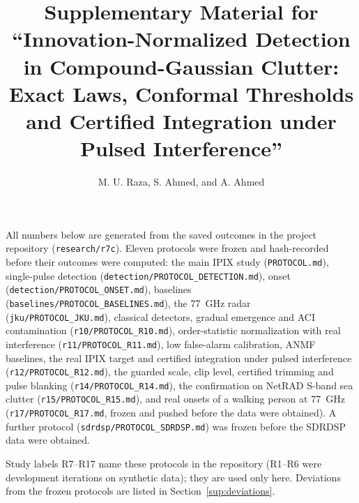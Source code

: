 \documentclass[10pt]{article}
\title{Supplementary Material for ``Innovation-Normalized Detection in Compound-Gaussian Clutter: Exact Laws, Conformal Thresholds and Certified Integration under Pulsed Interference''}
\author{M. U. Raza, S. Ahmed, and A. Ahmed}
\date{}
\begin{document}
\sloppy
\maketitle
\noindent All numbers below are generated from the saved outcomes in the project repository (\texttt{research/r7c}). Eleven protocols were frozen and hash-recorded before their outcomes were computed: the main IPIX study (\texttt{PROTOCOL.md}), single-pulse detection (\texttt{detection/PROTOCOL\_DETECTION.md}), onset (\texttt{detection/PROTOCOL\_ONSET.md}), baselines (\texttt{baselines/PROTOCOL\_BASELINES.md}), the 77~GHz radar (\texttt{jku/PROTOCOL\_JKU.md}), classical detectors, gradual emergence and ACI contamination (\texttt{r10/PROTOCOL\_R10.md}), order-statistic normalization with real interference (\texttt{r11/PROTOCOL\_R11.md}), low false-alarm calibration, ANMF baselines, the real IPIX target and certified integration under pulsed interference (\texttt{r12/PROTOCOL\_R12.md}), the guarded scale, clip level, certified trimming and pulse blanking (\texttt{r14/PROTOCOL\_R14.md}), the confirmation on NetRAD S-band sea clutter (\texttt{r15/PROTOCOL\_R15.md}), and real onsets of a walking person at 77~GHz (\texttt{r17/PROTOCOL\_R17.md}, frozen and pushed before the data were obtained). A further protocol (\texttt{sdrdsp/PROTOCOL\_SDRDSP.md}) was frozen before the SDRDSP data were obtained.

Study labels R7--R17 name these protocols in the repository (R1--R6 were development iterations on synthetic data); they are used only here. Deviations from the frozen protocols are listed in Section~\ref{sup:deviations}.
\end{document}
